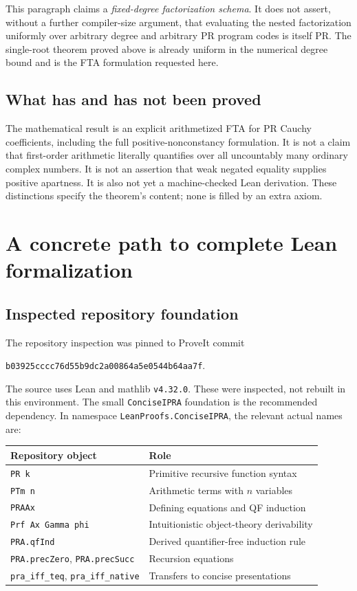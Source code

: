 \documentclass[11pt,letterpaper]{article}
\theoremstyle{definition}\newtheorem{definition}[theorem]{Definition}
\theoremstyle{remark}\newtheorem{remark}[theorem]{Remark}
\begin{document}
This paragraph claims a \emph{fixed-degree factorization schema}. It does
not assert, without a further compiler-size argument, that evaluating the
nested factorization uniformly over arbitrary degree and arbitrary PR
program codes is itself PR. The single-root theorem proved above is
already uniform in the numerical degree bound and is the FTA formulation
requested here.

\subsection{What has and has not been proved}

The mathematical result is an explicit arithmetized FTA for PR Cauchy
coefficients, including the full positive-nonconstancy formulation. It is
not a claim that first-order arithmetic literally quantifies over all
uncountably many ordinary complex numbers. It is not an assertion that weak
negated equality supplies positive apartness. It is also not yet a
machine-checked Lean derivation. These distinctions specify the theorem's
content; none is filled by an extra axiom.

\section{A concrete path to complete Lean formalization}
\label{sec:lean}

\subsection{Inspected repository foundation}

The repository inspection was pinned to ProveIt commit
\begin{center}
\texttt{b03925cccc76d55b9dc2a00864a5e0544b64aa7f}.
\end{center}
The source uses Lean and mathlib \texttt{v4.32.0}. These were inspected, not
rebuilt in this environment. The small \texttt{ConciseIPRA} foundation is
the recommended dependency. In namespace \texttt{LeanProofs.ConciseIPRA},
the relevant actual names are:

\begin{center}
\begin{tabular}{@{}ll@{}}\toprule
Repository object & Role \\
\midrule
\texttt{PR k} & Primitive recursive function syntax \\
\texttt{PTm n} & Arithmetic terms with $n$ variables \\
\texttt{PRAAx} & Defining equations and QF induction \\
\texttt{Prf Ax Gamma phi} & Intuitionistic object-theory derivability \\
\texttt{PRA.qfInd} & Derived quantifier-free induction rule \\
\texttt{PRA.precZero}, \texttt{PRA.precSucc} & Recursion equations \\
\texttt{pra\_iff\_teq}, \texttt{pra\_iff\_native} & Transfers to concise presentations \\
\bottomrule\end{tabular}
\end{center}
\end{document}
